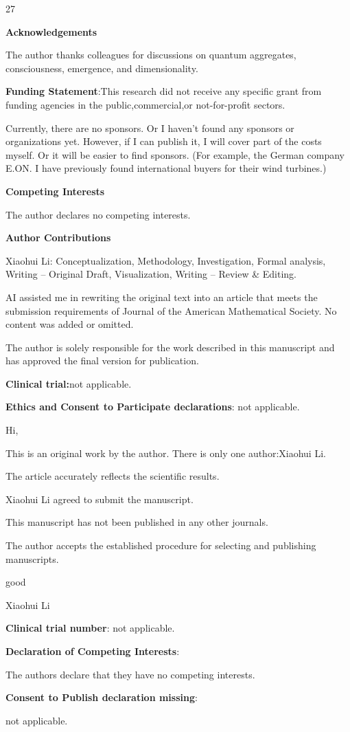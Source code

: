 \documentclass[11pt,a4paper]{article}
\theoremstyle{plain}
\begin{document}
\begin{thebibliography}{27}
  
  
  \textbf{\textbf{Acknowledgements}}

The author thanks colleagues for discussions on quantum aggregates, consciousness, emergence, and dimensionality. 

 \textbf{\textbf{Funding Statement}}:This research did not receive any specific grant from funding agencies in the public,commercial,or not-for-profit sectors.

Currently, there are no sponsors. Or I haven't found any sponsors or organizations yet. However, if I can publish it, I will cover part of the costs myself. Or it will be easier to find sponsors. (For example, the German company E.ON. I have previously found international buyers for their wind turbines.)

 \textbf{\textbf{Competing Interests}}

The author declares no competing interests.

 \textbf{\textbf{Author Contributions}}

Xiaohui Li: Conceptualization, Methodology, Investigation, Formal analysis, Writing – Original Draft, Visualization, Writing – Review \& Editing.

AI assisted me in rewriting the original text into an article that meets the submission requirements of Journal of the American Mathematical Society. No content was added or omitted.

 The author is solely responsible for the work described in this manuscript and has approved the final version for publication.

 \textbf{\textbf{Clinical trial:}}not applicable.

 \textbf{\textbf{Ethics and Consent to Participate declarations}}: not applicable.

 Hi,

This is an original work by the author. There is only one author:Xiaohui Li.

The article accurately reflects the scientific results.

Xiaohui Li agreed to submit the manuscript.

This manuscript has not been published in any other journals.

The author accepts the established procedure for selecting and publishing manuscripts.

good

Xiaohui Li



 \textbf{\textbf{Clinical trial number}}: not applicable.
 
 \textbf{\textbf{Declaration of Competing Interests}}: 

The authors declare that they have no competing interests.


\textbf{\textbf{Consent to Publish declaration missing}}: 

not applicable.


\end{thebibliography}
\end{document}
